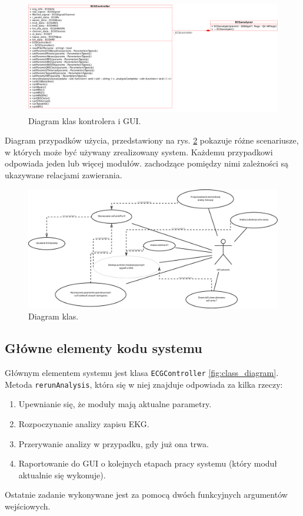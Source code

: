 \documentclass[a4paper, 11pt]{article}
\begin{document}
\begin{figure}[h!]
  \centering
  \includegraphics[width=0.9\linewidth]{include/controller-gui}
  \caption{Diagram klas kontrolera i GUI.}
  \label{fig:controller-gui}
\end{figure}

Diagram przypadków użycia, przedstawiony na rys. \ref{fig:use_case_diagram} pokazuje różne scenariusze, w których może być używany zrealizowany system. Każdemu przypadkowi odpowiada jeden lub więcej modułów. zachodzące pomiędzy nimi zależności są ukazywane relacjami zawierania.
\begin{figure}[h!]
  \centering
  \includegraphics[width=\linewidth]{include/use_case_diagram}
  \caption{Diagram klas.}
  \label{fig:use_case_diagram}
\end{figure}

\subsection{Główne elementy kodu systemu}

Głównym elementem systemu jest klasa \verb+ECGController+ \ref{fig:class_diagram}. Metoda \verb+rerunAnalysis+, która się w niej znajduje odpowiada za kilka rzeczy:
\begin{enumerate}
\item Upewnianie się, że moduły mają aktualne parametry.
\item Rozpoczynanie analizy zapisu EKG.
\item Przerywanie analizy w przypadku, gdy już ona trwa.
\item Raportowanie do GUI o kolejnych etapach pracy systemu (który moduł aktualnie się wykonuje).
\end{enumerate}
Ostatnie zadanie wykonywane jest za pomocą dwóch funkcyjnych argumentów wejściowych.
\end{document}
